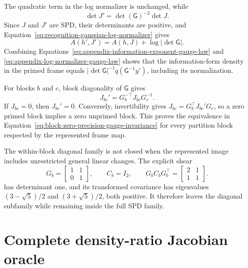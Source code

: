 The quadratic term in the log normalizer is unchanged, while
\begin{equation}
\det J'
=\det(\mathsf G)^{-2}\det J.
\label{eq:appendix-information-determinant-gauge-law}
\end{equation}
Since \(J\) and \(J'\) are SPD, their determinants are positive, and Equation~\eqref{eq:recognition-gaussian-log-normalizer} gives
\begin{equation}
A(h',J')
=A(h,J)+\log|\det\mathsf G|.
\label{eq:appendix-log-normalizer-gauge-law}
\end{equation}
Combining Equations~\eqref{eq:appendix-information-exponent-gauge-law} and \eqref{eq:appendix-log-normalizer-gauge-law} shows that the information-form density in the primed frame equals \(|\det\mathsf G|^{-1}q(\mathsf G^{-1}y')\), including its normalization.

For blocks \(b\) and \(c\), block diagonality of \(\mathsf G\) gives
\begin{equation}
J_{bc}'=G_b^{-\top}J_{bc}G_c^{-1}.
\label{eq:appendix-precision-block-gauge-law}
\end{equation}
If \(J_{bc}=0\), then \(J_{bc}'=0\). Conversely, invertibility gives \(J_{bc}=G_b^\top J_{bc}'G_c\), so a zero primed block implies a zero unprimed block. This proves the equivalence in Equation~\eqref{eq:block-zero-precision-gauge-invariance} for every partition block respected by the represented frame map.

The within-block diagonal family is not closed when the represented image includes unrestricted general linear changes. The explicit shear
\begin{equation}
G_b=
\begin{bmatrix}
1&1\\
0&1
\end{bmatrix},
\qquad
C_b=I_2,
\qquad
G_bC_bG_b^\top=
\begin{bmatrix}
2&1\\
1&1
\end{bmatrix}.
\label{eq:appendix-diagonal-family-counterexample}
\end{equation}
has determinant one, and its transformed covariance has eigenvalues \((3-\sqrt5)/2\) and \((3+\sqrt5)/2\), both positive. It therefore leaves the diagonal subfamily while remaining inside the full SPD family.

\section{Complete density-ratio Jacobian oracle}
\label{sec:population-density-ratio-oracle}

